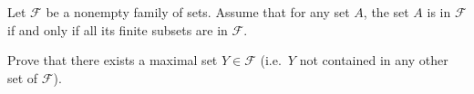 \begin{problem}
	Let $\mathcal F$ be a nonempty family of sets.
	Assume that for any set $A$,
	the set $A$ is in $\mathcal F$
	if and only if all its finite subsets are in $\mathcal F$.

	Prove that there exists a maximal set $Y \in \mathcal F$
	(i.e.\ $Y$ not contained in any other set of $\mathcal F$).
\end{problem}
